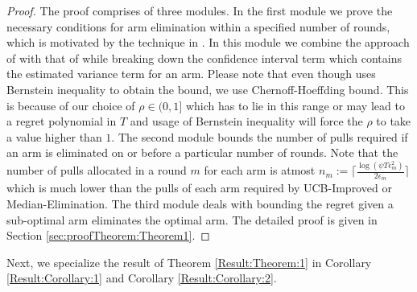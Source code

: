 \begin{proof}
The proof comprises of three modules. In the first module we prove the necessary conditions for arm elimination within a specified number of rounds, which is motivated by the technique in \cite{auer2010ucb}. In this module we combine the approach of \cite{audibert2009exploration} with that of  \cite{auer2010ucb} while breaking down the confidence interval term which contains the estimated variance   term for an arm. Please note that even though \cite{audibert2009exploration} uses Bernstein inequality to obtain the  bound, we use Chernoff-Hoeffding bound. This is because of our choice of $\rho\in (0,1]$ which has to lie in this range or may lead to a regret polynomial in $T$ and usage of Bernstein inequality will force the $\rho$ to take a value higher than $1$. The second module bounds the number of pulls required if an arm is eliminated on or before a particular number of rounds. Note that the number of pulls allocated in a round $m$ for each arm is atmost $n_{m}:=\bigg\lceil\frac{\log{(\psi T\epsilon_{m}^{2})}}{2\epsilon_{m}}\bigg\rceil$ which is much lower than the pulls of each arm required by UCB-Improved or Median-Elimination. The third module deals with bounding the regret given a sub-optimal arm eliminates the optimal arm. The detailed proof is given in Section \ref{sec:proofTheorem:Theorem1}.
\end{proof}
Next, we specialize the result of Theorem \ref{Result:Theorem:1} in Corollary \ref{Result:Corollary:1} and Corollary \ref{Result:Corollary:2}.

